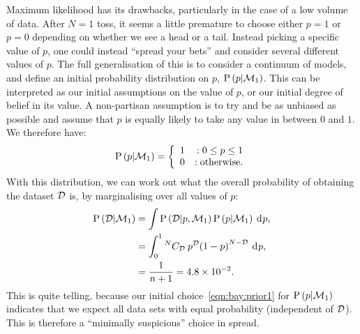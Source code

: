 Maximum likelihood has its drawbacks, particularly in the case of a low volume of data. After \(N=1\) toss, it seems a little premature to choose either \(p=1\) or \(p=0\) depending on whether we see a head or a tail. Instead picking a specific value of \(p\), one could instead ``spread your bets'' and consider several different values of \(p\). The full generalisation of this is to consider a continuum of models, and define an initial probability distribution on \(p\), \(\mathrm{P}\left(p\middle|\mathcal{M}_1\right)\). This can be interpreted as our initial assumptions on the value of \(p\), or our initial degree of belief in its value.
A non-partisan assumption is to try and be as unbiased as possible and assume that \(p\) is equally likely to take any value in between \(0\) and \(1\). We therefore have:
\begin{equation}
  \mathrm{P}\left(p\middle|\mathcal{M}_1\right)=\left\{
  \begin{array}{lr}
    1 &:0\le p\le1\\
    0 &:\text{otherwise.}\\
  \end{array}
  \right.\label{eqn:bay:prior1}
\end{equation}
With this distribution, we can work out what the overall probability of obtaining the dataset \(\mathcal{D}\) is, by marginalising over all values of \(p\):
\begin{align}
  \mathrm{P}\left(\mathcal{D}\middle|\mathcal{M}_1\right) 
  &= \int \mathrm{P}\left(\mathcal{D}\middle|p,\mathcal{M}_1\right)\mathrm{P}\left(p\middle|\mathcal{M}_1\right)\: \operatorname{d}^{}\!{p}, \\
  &= \int_0^1 {^{N}C_{\mathcal{D}}}\: {p}^{\mathcal{D}} {\left(1 - p \right)}^{N-\mathcal{D}}\: \operatorname{d}^{}\!{p}, \\
  &= \frac{1}{n+1} = 4.8\times10^{-2}.
  \label{eqn:bay:marg}
\end{align}
This is quite telling, because our initial choice~\eqref{eqn:bay:prior1} for \(\mathrm{P}\left(p\middle|\mathcal{M}_1\right)\) indicates that we expect all data sets with equal probability (independent of \(\mathcal{D}\)). This is therefore a ``minimally suspicious'' choice in spread.

